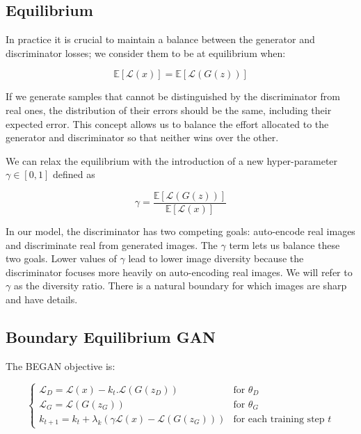 \documentclass[english]{article}
\begin{document}
\subsection{Equilibrium}

In practice it is crucial to maintain a balance between the generator
and discriminator losses; we consider them to be at equilibrium when:

\begin{equation}
\mathbb{E}\left[\mathcal{L}(x)\right]=\mathbb{E}\left[\mathcal{L}(G(z))\right]\label{eq:equilibrium}
\end{equation}


If we generate samples that cannot be distinguished by the discriminator
from real ones, the distribution of their errors should be the same,
including their expected error. This concept allows us to balance
the effort allocated to the generator and discriminator so that neither
wins over the other.

We can relax the equilibrium with the introduction of a new hyper-parameter
$\gamma\in[0,1]$ defined as

\begin{equation}
\gamma=\frac{\mathbb{E}\left[\mathcal{L}(G(z))\right]}{\mathbb{E}\left[\mathcal{L}(x)\right]}\label{eq:gamma}
\end{equation}


In our model, the discriminator has two competing goals: auto-encode
real images and discriminate real from generated images. The $\gamma$
term lets us balance these two goals. Lower values of $\gamma$ lead
to lower image diversity because the discriminator focuses more heavily
on auto-encoding real images. We will refer to $\gamma$ as the diversity
ratio. There is a natural boundary for which images are sharp and
have details.


\subsection{Boundary Equilibrium GAN}

The BEGAN objective is:

\[
\begin{cases}
\mathcal{L}_{D}=\mathcal{L}(x)-k_{t}.\mathcal{L}(G(z_{D})) & \textrm{for }\theta_{D}\\
\mathcal{L}_{G}=\mathcal{L}(G(z_{G})) & \textrm{for }\theta_{G}\\
k_{t+1}=k_{t}+\lambda_{k}(\gamma\mathcal{L}(x)-\mathcal{L}(G(z_{G}))) & \textrm{for each training step }t
\end{cases}
\]
\end{document}
